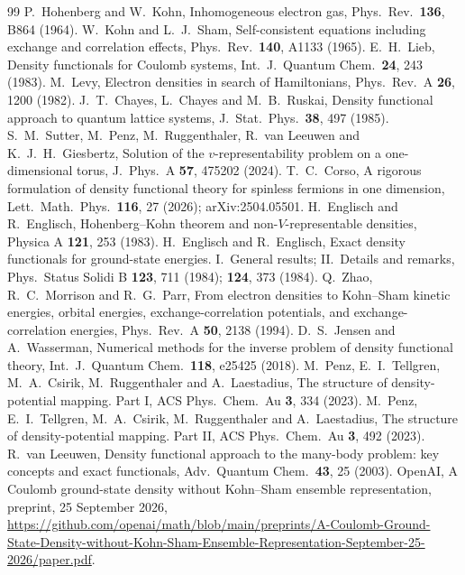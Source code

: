 \documentclass[11pt,a4paper]{article}
\theoremstyle{plain}
\theoremstyle{definition}
\theoremstyle{remark}
\begin{document}
\begin{thebibliography}{99}\small
{} P.~Hohenberg and W.~Kohn, Inhomogeneous electron gas, Phys.\ Rev.\ \textbf{136}, B864 (1964).
 W.~Kohn and L.~J.~Sham, Self-consistent equations including exchange and correlation effects, Phys.\ Rev.\ \textbf{140}, A1133 (1965).
 E.~H.~Lieb, Density functionals for Coulomb systems, Int.\ J.\ Quantum Chem.\ \textbf{24}, 243 (1983).
 M.~Levy, Electron densities in search of Hamiltonians, Phys.\ Rev.\ A \textbf{26}, 1200 (1982).
 J.~T.~Chayes, L.~Chayes and M.~B.~Ruskai, Density functional approach to quantum lattice systems, J.\ Stat.\ Phys.\ \textbf{38}, 497 (1985).
 S.~M.~Sutter, M.~Penz, M.~Ruggenthaler, R.~van Leeuwen and K.~J.~H.~Giesbertz, Solution of the $v$-representability problem on a one-dimensional torus, J.\ Phys.\ A \textbf{57}, 475202 (2024).
 T.~C.~Corso, A rigorous formulation of density functional theory for spinless fermions in one dimension, Lett.\ Math.\ Phys.\ \textbf{116}, 27 (2026); arXiv:2504.05501.
 H.~Englisch and R.~Englisch, Hohenberg--Kohn theorem and non-$V$-representable densities, Physica A \textbf{121}, 253 (1983).
 H.~Englisch and R.~Englisch, Exact density functionals for ground-state energies. I.~General results; II.~Details and remarks, Phys.\ Status Solidi B \textbf{123}, 711 (1984); \textbf{124}, 373 (1984).
 Q.~Zhao, R.~C.~Morrison and R.~G.~Parr, From electron densities to Kohn--Sham kinetic energies, orbital energies, exchange-correlation potentials, and exchange-correlation energies, Phys.\ Rev.\ A \textbf{50}, 2138 (1994).
 D.~S.~Jensen and A.~Wasserman, Numerical methods for the inverse problem of density functional theory, Int.\ J.\ Quantum Chem.\ \textbf{118}, e25425 (2018).
 M.~Penz, E.~I.~Tellgren, M.~A.~Csirik, M.~Ruggenthaler and A.~Laestadius, The structure of density-potential mapping. Part I, ACS Phys.\ Chem.\ Au \textbf{3}, 334 (2023).
 M.~Penz, E.~I.~Tellgren, M.~A.~Csirik, M.~Ruggenthaler and A.~Laestadius, The structure of density-potential mapping. Part II, ACS Phys.\ Chem.\ Au \textbf{3}, 492 (2023).
 R.~van Leeuwen, Density functional approach to the many-body problem: key concepts and exact functionals, Adv.\ Quantum Chem.\ \textbf{43}, 25 (2003).
 OpenAI, A Coulomb ground-state density without Kohn--Sham ensemble representation, preprint, 25 September 2026, \url{https://github.com/openai/math/blob/main/preprints/A-Coulomb-Ground-State-Density-without-Kohn-Sham-Ensemble-Representation-September-25-2026/paper.pdf}.

\end{thebibliography}
\end{document}
